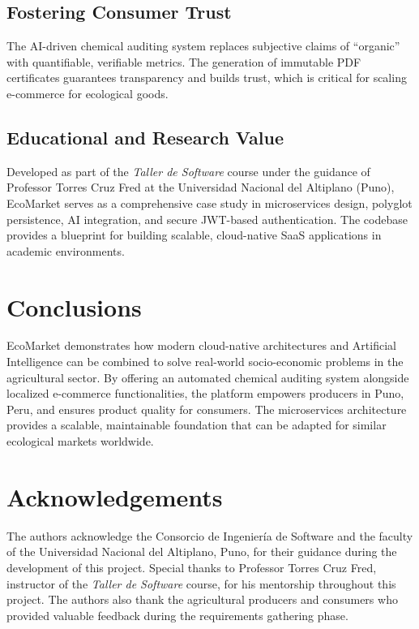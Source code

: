 \documentclass[preprint,12pt,a4paper]{elsarticle}
\begin{document}
\subsection*{Fostering Consumer Trust}
The AI-driven chemical auditing system replaces subjective claims of ``organic'' with quantifiable, verifiable metrics. The generation of immutable PDF certificates guarantees transparency and builds trust, which is critical for scaling e-commerce for ecological goods.

\subsection*{Educational and Research Value}
Developed as part of the \textit{Taller de Software} course under the guidance of Professor Torres Cruz Fred at the Universidad Nacional del Altiplano (Puno), EcoMarket serves as a comprehensive case study in microservices design, polyglot persistence, AI integration, and secure JWT-based authentication. The codebase provides a blueprint for building scalable, cloud-native SaaS applications in academic environments.

\section{Conclusions}

EcoMarket demonstrates how modern cloud-native architectures and Artificial Intelligence can be combined to solve real-world socio-economic problems in the agricultural sector. By offering an automated chemical auditing system alongside localized e-commerce functionalities, the platform empowers producers in Puno, Peru, and ensures product quality for consumers. The microservices architecture provides a scalable, maintainable foundation that can be adapted for similar ecological markets worldwide.

\section*{Acknowledgements}

The authors acknowledge the Consorcio de Ingeniería de Software and the faculty of the Universidad Nacional del Altiplano, Puno, for their guidance during the development of this project. Special thanks to Professor Torres Cruz Fred, instructor of the \textit{Taller de Software} course, for his mentorship throughout this project. The authors also thank the agricultural producers and consumers who provided valuable feedback during the requirements gathering phase.
\end{document}
